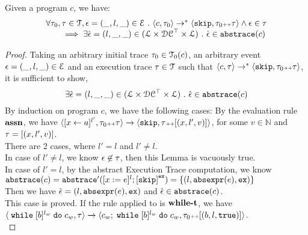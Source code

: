 \begin{lem}
  Given a program ${c}$, we have:
  \[
    \begin{array}{l}
      \forall \mathtt{\tau}_0, \mathtt{\tau} \in \mathcal{T} ,  \mathtt{\epsilon} = (\_, l, \_) \in \mathcal{E} ~.~
  \langle {c}, \mathtt{\tau}_0 \rangle \to^{*} \langle \mathtt{skip}, \mathtt{\tau}_0 {\scriptscriptstyle ++} \mathtt{\tau} \rangle 
  \land \mathtt{\epsilon} \in \mathtt{\tau} 
  \\
  \qquad \implies \exists \hat{\mathtt{\epsilon}{}} = (l, \_, \_) \in (\mathcal{L}\times \mathcal{DC}^{\top} \times \mathcal{L}) ~.~ 
  \hat{\mathtt{\epsilon}{}} \in \mathtt{abs}{\mathtt{trace}}(c)
  \end{array}
  \]
  \end{lem}
  \begin{proof}
    Taking an arbitrary initial trace $\mathtt{\tau}_0 \in \mathcal{T}_0(c)$, an arbitrary event $\mathtt{\epsilon} = (\_, l, \_) \in \mathcal{E}$ and an execution trace $\mathtt{\tau} \in \mathcal{T}$
    such that $\langle {c}, \mathtt{\tau} \rangle \to^{*} \langle \mathtt{skip}, \mathtt{\tau}_0 {\scriptscriptstyle ++} \mathtt{\tau} \rangle$,
    it is sufficient to show,
    \[
      \exists \hat{\mathtt{\epsilon}{}} = (l, \_, \_) \in (\mathcal{L}\times \mathcal{DC}^{\top} \times \mathcal{L}) ~.~ 
      \hat{\mathtt{\epsilon}{}} \in \mathtt{abs}{\mathtt{trace}}(c)
    \]
    By induction on program $c$, we have the following cases:
    By the evaluation rule $\rname{assn}$, we have
    $
    {
    \langle [\mathrel{ {x} \leftarrow a }]^{l'},  \mathtt{\tau}_0 {\scriptscriptstyle ++} \mathtt{\tau}  \rangle 
    \xrightarrow{} 
    \langle \mathtt{skip}, \mathtt{\tau} {\scriptscriptstyle ++} [({x}, l', v) ] \rangle
    }$, for some $v \in \mathbb{N}$ and $\mathtt{\tau} = [({x}, l', v) ]$.
    \\
    There are 2 cases, where $l' = l$ and $l' \neq l$.
    \\
    In case of $l' \neq l$, we know $\mathtt{\epsilon} \not\in \mathtt{\tau}$, then this Lemma is vacuously true.
      \\
      In case of $l' = l$, by the abstract Execution Trace computation, we know 
      $\absflow(c) = \absflow'([x := \expr]^{l}; \clabel{\eskip}^{\lex}) = \{(l, \absexpr(\expr), \lex)\}$  
      \\
    Then we have $\hat{\mathtt{\epsilon}{}} = (l, \mathtt{abs}{\mathtt{expr}}(e), \mathtt{ex}) $ and $\hat{\mathtt{\epsilon}{}} \in \mathtt{abs}{\mathtt{trace}}(c)$.
    \\
    This case is proved.
    If the rule applied to is $\rname{while-t}$, we have
    \\
    $\langle {\;\ensuremath{\mathtt{while}}\;[b]^{l_w} \;\ensuremath{\mathtt{do}}\;c_w, \ensuremath{\mathtt{\tau}}} \rangle
      \xrightarrow{} 
      \langle {
      c_w; \;\ensuremath{\mathtt{while}}\;[b]^{l_w} \;\ensuremath{\mathtt{do}}\;c_w,
      \ensuremath{\mathtt{\tau}}_0 {\scriptscriptstyle ++}[(b, l, \ensuremath{\mathtt{true}})]} \rangle
    $.
    \\

\end{proof}
